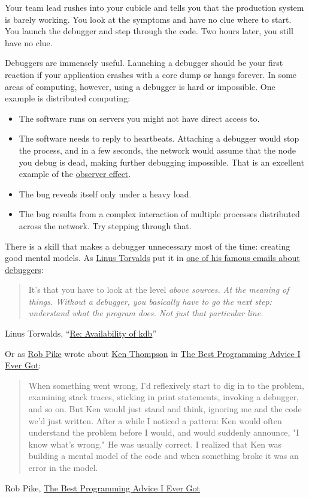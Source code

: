 \documentclass{article}
\begin{document}
Your team lead rushes into your cubicle and tells you that the production system is barely working.
You look at the symptoms and have no clue where to start.
You launch the debugger and step through the code.
Two hours later, you still have no clue.

Debuggers are immensely useful.
Launching a debugger should be your first reaction if your application crashes with a core dump or hangs forever.
In some areas of computing, however, using a debugger is hard or impossible.
One example is distributed computing:
\begin{itemize}
  \item 
    The software runs on servers you might not have direct access to.
  \item 
    The software needs to reply to heartbeats.
    Attaching a debugger would stop the process, and in a few seconds, the network would assume that the node you debug is dead, making further debugging impossible.
    That is an excellent example of the \href{https://en.wikipedia.org/wiki/Observer_effect_(physics)}{observer effect}.
  \item 
    The bug reveals itself only under a heavy load.
  \item 
    The bug results from a complex interaction of multiple processes distributed across the network.
    Try stepping through that.
\end{itemize}

There is a skill that makes a debugger unnecessary most of the time: creating good mental models.
As \href{https://en.wikipedia.org/wiki/Linus_Torvalds}{Linus Torvalds} put it in \href{https://lkml.org/lkml/2000/9/6/65}{one of his famous emails about debuggers}:

\blockquote{
  It's that you have to look at the level \em{above} sources.
  At the meaning of things.
  Without a debugger, you basically have to go the next step: understand what the program does.
  Not just that particular line.
}{Linus Torwalds, ``\href{https://lkml.org/lkml/2000/9/6/65}{Re: Availability of kdb}''}

Or as \href{https://en.wikipedia.org/wiki/Rob_Pike}{Rob Pike} wrote about \href{https://en.wikipedia.org/wiki/Ken_Thompson}{Ken Thompson} in \href{https://www.informit.com/articles/article.aspx?p=1941206}{The Best Programming Advice I Ever Got}:

\blockquote{
  When something went wrong, I'd reflexively start to dig in to the problem, examining stack traces, sticking in print statements, invoking a debugger, and so on.
  But Ken would just stand and think, ignoring me and the code we'd just written.
  After a while I noticed a pattern: Ken would often understand the problem before I would, and would suddenly announce, "I know what's wrong."
  He was usually correct.
  I realized that Ken was building a mental model of the code and when something broke it was an error in the model.
}{Rob Pike, \href{https://www.informit.com/articles/article.aspx?p=1941206}{The Best Programming Advice I Ever Got}}
\end{document}
